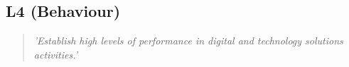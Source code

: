 \subsection*{L4 (Behaviour)}

  \begin{quote}
    \textit{'Establish high levels of performance in
    digital and technology solutions activities.'}
  \end{quote}

\newpage